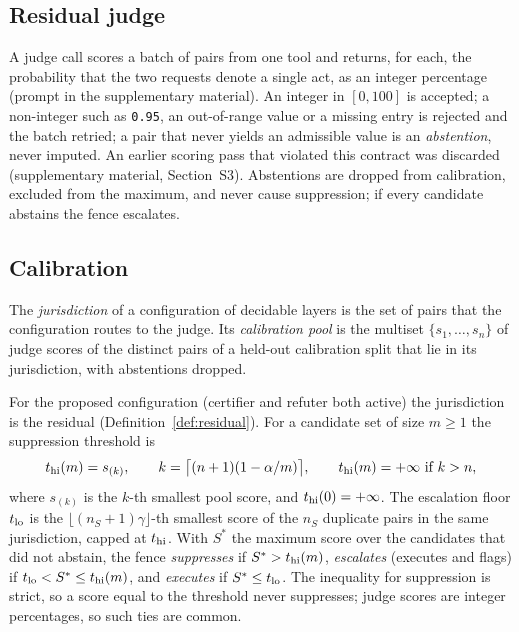 \subsection{Residual judge}\label{sec:judge}

A judge call scores a batch of pairs from one tool and returns, for each, the probability that the two requests denote a single act, as an integer percentage (prompt in the supplementary material). An integer in $[0,100]$ is accepted; a non-integer such as \texttt{0.95}, an out-of-range value or a missing entry is rejected and the batch retried; a pair that never yields an admissible value is an \emph{abstention}, never imputed. An earlier scoring pass that violated this contract was discarded (supplementary material, Section~S3). Abstentions are dropped from calibration, excluded from the maximum, and never cause suppression; if every candidate abstains the fence escalates.

\subsection{Calibration}\label{sec:calibration}

\begin{definition}\label{def:jurisdiction}
The \emph{jurisdiction} of a configuration of decidable layers is the set of pairs that the configuration routes to the judge. Its \emph{calibration pool} is the multiset $\{s_1,\dots,s_n\}$ of judge scores of the distinct pairs of a held-out calibration split that lie in its jurisdiction, with abstentions dropped.
\end{definition}

For the proposed configuration (certifier and refuter both active) the jurisdiction is the residual (Definition~\ref{def:residual}). For a candidate set of size $m\ge1$ the suppression threshold is
\begin{equation}\label{eq:thi}
t_{\mathrm{hi}}(m)=s_{(k)},\qquad k=\big\lceil (n+1)(1-\alpha/m)\big\rceil,\qquad t_{\mathrm{hi}}(m)=+\infty \text{ if } k>n,
\end{equation}
where $s_{(k)}$ is the $k$-th smallest pool score, and $t_{\mathrm{hi}}(0)=+\infty$. The escalation floor $t_{\mathrm{lo}}$ is the $\lfloor (n_S+1)\gamma\rfloor$-th smallest score of the $n_S$ duplicate pairs in the same jurisdiction, capped at $t_{\mathrm{hi}}$. With $S^\ast$ the maximum score over the candidates that did not abstain, the fence \emph{suppresses} if $S^\ast>t_{\mathrm{hi}}(m)$, \emph{escalates} (executes and flags) if $t_{\mathrm{lo}}<S^\ast\le t_{\mathrm{hi}}(m)$, and \emph{executes} if $S^\ast\le t_{\mathrm{lo}}$. The inequality for suppression is strict, so a score equal to the threshold never suppresses; judge scores are integer percentages, so such ties are common.

